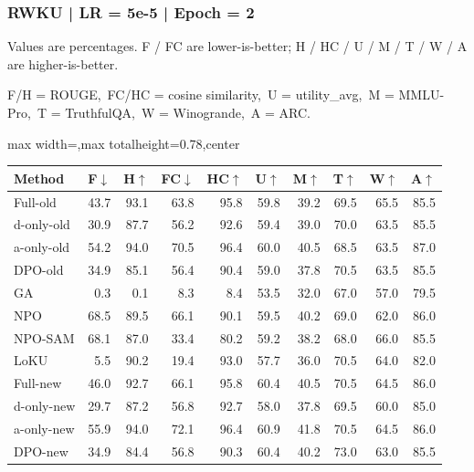 \documentclass[aspectratio=169,11pt]{beamer}
\begin{document}
\begin{frame}[t]
\frametitle{RWKU | LR = 5e-5 | Epoch = 2}
{\tiny Values are percentages. F / FC are lower-is-better; H / HC / U / M / T / W / A are higher-is-better.}

{\tiny F/H = ROUGE,\ FC/HC = cosine similarity,\ U = utility\_avg,\ M = MMLU-Pro,\ T = TruthfulQA,\ W = Winogrande,\ A = ARC.}

\vspace{0.35em}
\centering
\scriptsize
\setlength{\tabcolsep}{3.6pt}
\renewcommand{\arraystretch}{1.05}
\begin{adjustbox}{max width=\textwidth,max totalheight=0.78\textheight,center}
\begin{tabular}{l*{9}{r}}
\toprule
Method & F$\downarrow$ & H$\uparrow$ & FC$\downarrow$ & HC$\uparrow$ & U$\uparrow$ & M$\uparrow$ & T$\uparrow$ & W$\uparrow$ & A$\uparrow$ \\
\midrule
\rowcolor{blue!10}
Full-old & 43.7 & 93.1 & 63.8 & 95.8 & 59.8 & 39.2 & 69.5 & 65.5 & 85.5 \\
\rowcolor{orange!10}
d-only-old & 30.9 & 87.7 & 56.2 & 92.6 & 59.4 & 39.0 & 70.0 & 63.5 & 85.5 \\
\rowcolor{green!10}
a-only-old & 54.2 & 94.0 & 70.5 & 96.4 & 60.0 & 40.5 & 68.5 & 63.5 & 87.0 \\
\rowcolor{gray!8}
DPO-old & 34.9 & 85.1 & 56.4 & 90.4 & 59.0 & 37.8 & 70.5 & 63.5 & 85.5 \\
\rowcolor{gray!8}
GA & 0.3 & 0.1 & 8.3 & 8.4 & 53.5 & 32.0 & 67.0 & 57.0 & 79.5 \\
\rowcolor{gray!8}
NPO & 68.5 & 89.5 & 66.1 & 90.1 & 59.5 & 40.2 & 69.0 & 62.0 & 86.0 \\
\rowcolor{gray!8}
NPO-SAM & 68.1 & 87.0 & 33.4 & 80.2 & 59.2 & 38.2 & 68.0 & 66.0 & 85.5 \\
\rowcolor{gray!8}
LoKU & 5.5 & 90.2 & 19.4 & 93.0 & 57.7 & 36.0 & 70.5 & 64.0 & 82.0 \\
\rowcolor{blue!20}
Full-new & 46.0 & 92.7 & 66.1 & 95.8 & 60.4 & 40.5 & 70.5 & 64.5 & 86.0 \\
\rowcolor{orange!20}
d-only-new & 29.7 & 87.2 & 56.8 & 92.7 & 58.0 & 37.8 & 69.5 & 60.0 & 85.0 \\
\rowcolor{green!20}
a-only-new & 55.9 & 94.0 & 72.1 & 96.4 & 60.9 & 41.8 & 70.5 & 64.5 & 86.0 \\
\rowcolor{gray!15}
DPO-new & 34.9 & 84.4 & 56.8 & 90.3 & 60.4 & 40.2 & 73.0 & 63.0 & 85.5 \\
\bottomrule
\end{tabular}
\end{adjustbox}
\end{frame}
\end{document}
